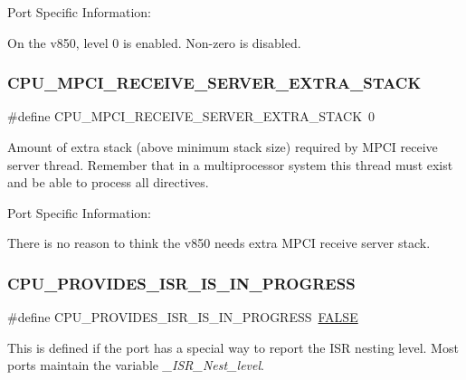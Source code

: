 Port Specific Information\+:

On the v850, level 0 is enabled. Non-\/zero is disabled. \mbox{\label{group__RTEMSScoreCPUV850CPUInterrupt_gab94869be93a41da88a10fa59771ce2c9}} 
\subsubsection{\texorpdfstring{CPU\_MPCI\_RECEIVE\_SERVER\_EXTRA\_STACK}{CPU\_MPCI\_RECEIVE\_SERVER\_EXTRA\_STACK}}
{\footnotesize\ttfamily \#define C\+P\+U\+\_\+\+M\+P\+C\+I\+\_\+\+R\+E\+C\+E\+I\+V\+E\+\_\+\+S\+E\+R\+V\+E\+R\+\_\+\+E\+X\+T\+R\+A\+\_\+\+S\+T\+A\+CK~0}

Amount of extra stack (above minimum stack size) required by M\+P\+CI receive server thread. Remember that in a multiprocessor system this thread must exist and be able to process all directives.

Port Specific Information\+:

There is no reason to think the v850 needs extra M\+P\+CI receive server stack. \mbox{\label{group__RTEMSScoreCPUV850CPUInterrupt_ga47f6e4d60c72b5f65fc775b0b5dd14ec}} 
\subsubsection{\texorpdfstring{CPU\_PROVIDES\_ISR\_IS\_IN\_PROGRESS}{CPU\_PROVIDES\_ISR\_IS\_IN\_PROGRESS}}
{\footnotesize\ttfamily \#define C\+P\+U\+\_\+\+P\+R\+O\+V\+I\+D\+E\+S\+\_\+\+I\+S\+R\+\_\+\+I\+S\+\_\+\+I\+N\+\_\+\+P\+R\+O\+G\+R\+E\+SS~\mbox{\hyperlink{group__RTEMSScoreBaseDefs_gaa93f0eb578d23995850d61f7d61c55c1}{F\+A\+L\+SE}}}

This is defined if the port has a special way to report the I\+SR nesting level. Most ports maintain the variable {\itshape \+\_\+\+I\+S\+R\+\_\+\+Nest\+\_\+level}. 

